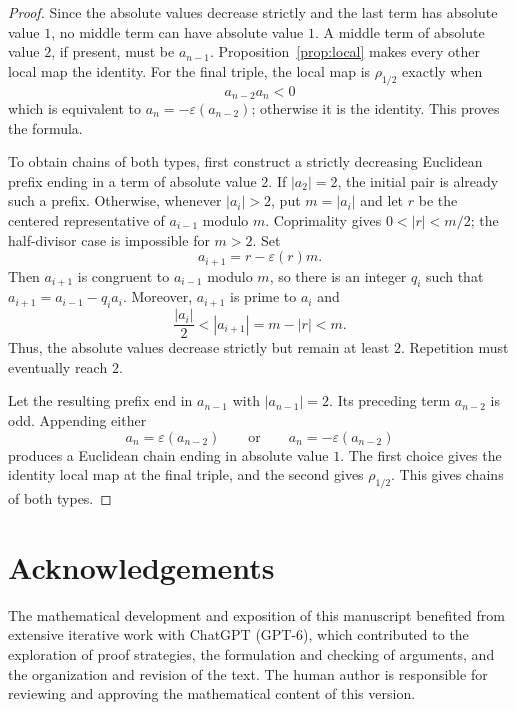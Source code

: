 \documentclass[12pt,letterpaper]{article}
\numberwithin{equation}{section}
\newcommand{\eps}{\varepsilon}
\theoremstyle{plain}
\theoremstyle{definition}
\begin{document}
\begin{proof}
Since the absolute values decrease strictly and the last term has absolute value $1$, no middle term can have absolute value $1$. A middle term of absolute value $2$, if present, must be $a_{n-1}$. Proposition~\ref{prop:local} makes every other local map the identity. For the final triple, the local map is $\rho_{1/2}$ exactly when
\[
 a_{n-2}a_n<0
\]
which is equivalent to $a_n=-\eps(a_{n-2})$; otherwise it is the identity. This proves the formula.

To obtain chains of both types, first construct a strictly decreasing Euclidean prefix ending in a term of absolute value $2$. If $|a_2|=2$, the initial pair is already such a prefix. Otherwise, whenever $|a_i|>2$, put $m=|a_i|$ and let $r$ be the centered representative of $a_{i-1}$ modulo $m$. Coprimality gives $0<|r|<m/2$; the half-divisor case is impossible for $m>2$. Set
\[
 a_{i+1}=r-\eps(r)m.
\]
Then $a_{i+1}$ is congruent to $a_{i-1}$ modulo $m$, so there is an integer $q_i$ such that $a_{i+1}=a_{i-1}-q_i a_i$. Moreover, $a_{i+1}$ is prime to $a_i$ and
\[
 \frac{|a_i|}{2}<|a_{i+1}|=m-|r|<m.
\]
Thus, the absolute values decrease strictly but remain at least $2$. Repetition must eventually reach $2$.

Let the resulting prefix end in $a_{n-1}$ with $|a_{n-1}|=2$. Its preceding term $a_{n-2}$ is odd. Appending either
\[
 a_n=\eps(a_{n-2})
 \qquad\text{or}\qquad
 a_n=-\eps(a_{n-2})
\]
produces a Euclidean chain ending in absolute value $1$. The first choice gives the identity local map at the final triple, and the second gives $\rho_{1/2}$. This gives chains of both types.
\end{proof}

\section*{Acknowledgements}
The mathematical development and exposition of this manuscript benefited from extensive iterative work with ChatGPT (GPT-6), which contributed to the exploration of proof strategies, the formulation and checking of arguments, and the organization and revision of the text. The human author is responsible for reviewing and approving the mathematical content of this version.
\end{document}
